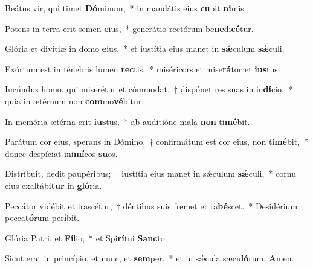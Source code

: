\item Beátus vir, qui timet \textbf{Dó}minum,~* in mandátis eius \textbf{cu}pit \textbf{ni}mis.

\item Potens in terra erit semen \textbf{e}ius,~* generátio rectórum be\textbf{ne}di\textbf{cé}tur.

\item Glória et divítiæ in domo \textbf{e}ius,~* et iustítia eius manet in \textbf{sǽ}culum \textbf{sǽ}culi.

\item Exórtum est in ténebris lumen \textbf{rec}tis,~* miséricors et mise\textbf{rá}tor et \textbf{ius}tus.

\item Iucúndus homo, qui miserétur et cómmodat,~† dispónet res suas in iu\textbf{dí}cio,~* quia in ætérnum non \textbf{com}mo\textbf{vé}bitur.

\item In memória ætérna erit \textbf{ius}tus,~* ab auditióne mala \textbf{non} ti\textbf{mé}bit.

\item Parátum cor eius, sperans in Dómino,~† confirmátum est cor eius, non ti\textbf{mé}bit,~* donec despíciat ini\textbf{mí}cos \textbf{su}os.

\item Distríbuit, dedit paupéribus;~† iustítia eius manet in sǽculum \textbf{sǽ}culi,~* cornu eius exaltábi\textbf{tur} in \textbf{gló}ria.

\item Peccátor vidébit et irascétur,~† déntibus suis fremet et ta\textbf{bé}scet.~* Desidérium pecca\textbf{tó}rum per\textbf{í}bit.

\item Glória Patri, et \textbf{Fí}lio,~* et Spi\textbf{rí}tui \textbf{Sanc}to.

\item Sicut erat in princípio, et nunc, et \textbf{sem}per,~* et in sǽcula sæcu\textbf{ló}rum. \textbf{A}men.
